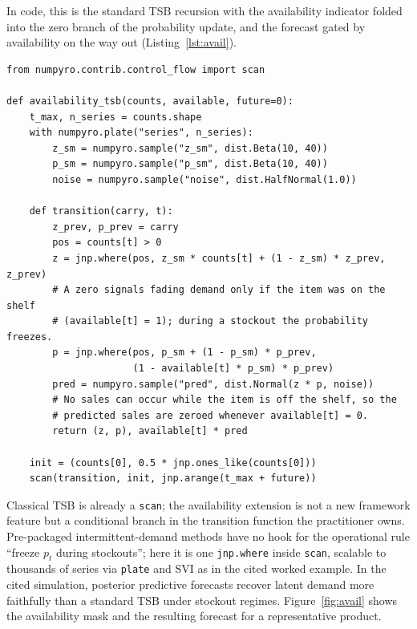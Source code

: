 \documentclass[11pt,3p,review,authoryear]{elsarticle}
\begin{document}
In code, this is the standard TSB recursion with the availability indicator folded into the zero branch of the probability update, and the forecast gated by availability on the way out (Listing~\ref{lst:avail}).

\begin{lstlisting}[float=!tbp,caption={Availability-aware TSB transition. The availability rule is one \texttt{jnp.where} branch inside the \texttt{scan} the practitioner owns. Conditioning on the observed counts and the forecast-horizon guards are elided for brevity.},label={lst:avail}]
from numpyro.contrib.control_flow import scan

def availability_tsb(counts, available, future=0):
    t_max, n_series = counts.shape
    with numpyro.plate("series", n_series):
        z_sm = numpyro.sample("z_sm", dist.Beta(10, 40))
        p_sm = numpyro.sample("p_sm", dist.Beta(10, 40))
        noise = numpyro.sample("noise", dist.HalfNormal(1.0))

    def transition(carry, t):
        z_prev, p_prev = carry
        pos = counts[t] > 0
        z = jnp.where(pos, z_sm * counts[t] + (1 - z_sm) * z_prev, z_prev)
        # A zero signals fading demand only if the item was on the shelf
        # (available[t] = 1); during a stockout the probability freezes.
        p = jnp.where(pos, p_sm + (1 - p_sm) * p_prev,
                      (1 - available[t] * p_sm) * p_prev)
        pred = numpyro.sample("pred", dist.Normal(z * p, noise))
        # No sales can occur while the item is off the shelf, so the
        # predicted sales are zeroed whenever available[t] = 0.
        return (z, p), available[t] * pred

    init = (counts[0], 0.5 * jnp.ones_like(counts[0]))
    scan(transition, init, jnp.arange(t_max + future))
\end{lstlisting}

Classical TSB is already a \texttt{scan}; the availability extension is not a new framework feature but a conditional branch in the transition function the practitioner owns. Pre-packaged intermittent-demand methods have no hook for the operational rule ``freeze $p_t$ during stockouts''; here it is one \texttt{jnp.where} inside \texttt{scan}, scalable to thousands of series via \texttt{plate} and SVI as in the cited worked example. In the cited simulation, posterior predictive forecasts recover latent demand more faithfully than a standard TSB under stockout regimes. Figure~\ref{fig:avail} shows the availability mask and the resulting forecast for a representative product.
\end{document}
